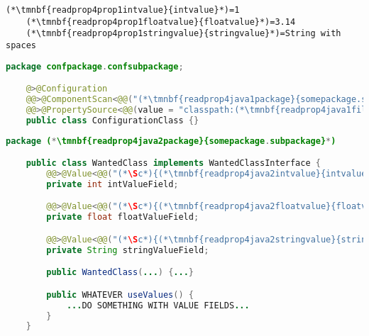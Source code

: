 \enlargethispage{20mm}
\thispagestyle{empty}
\begin{lstlisting}[title={A \textit{properties} file called \tmnbf{readprop4prop1filename}{\textit{annotations.properties}}}]
    (*\tmnbf{readprop4prop1intvalue}{intvalue}*)=1
    (*\tmnbf{readprop4prop1floatvalue}{floatvalue}*)=3.14
    (*\tmnbf{readprop4prop1stringvalue}{stringvalue}*)=String with spaces
\end{lstlisting}
\begin{lstlisting}[language=Java, title={Configuration class}]
    package confpackage.confsubpackage;

    @>@Configuration
    @@>@ComponentScan<@@("(*\tmnbf{readprop4java1package}{somepackage.subpackage}[ForestGreen]*)")
    @@>@PropertySource<@@(value = "classpath:(*\tmnbf{readprop4java1filename}{annotations.properties}[ForestGreen]*)", encoding = "utf-8")
    public class ConfigurationClass {}
\end{lstlisting}
\begin{lstlisting}[language=Java, title={Wanted class with any constructor}]
    package (*\tmnbf{readprop4java2package}{somepackage.subpackage}*)

    public class WantedClass implements WantedClassInterface {
        @@>@Value<@@("(*\Sc*){(*\tmnbf{readprop4java2intvalue}{intvalue}[ForestGreen]*)}")
        private int intValueField;

        @@>@Value<@@("(*\Sc*){(*\tmnbf{readprop4java2floatvalue}{floatvalue}[ForestGreen]*)}")
        private float floatValueField;

        @@>@Value<@@("(*\Sc*){(*\tmnbf{readprop4java2stringvalue}{stringvalue}[ForestGreen]*)}")
        private String stringValueField;

        public WantedClass(...) {...}

        public WHATEVER useValues() {
            ...DO SOMETHING WITH VALUE FIELDS...
        }
    }
\end{lstlisting}
\newpage

